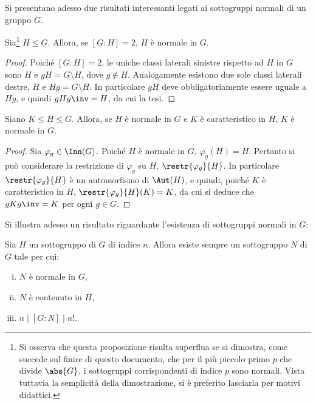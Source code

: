 \documentclass[12pt]{scrartcl}
\begin{document}
	Si presentano adesso due risultati interessanti legati ai sottogruppi normali di
	un gruppo $G$.
	
	\begin{proposition}
		Sia\footnote{
			Si osserva che questa proposizione risulta superflua se si dimostra,
			come succede sul finire di questo documento, che per il più piccolo
			primo $p$ che divide $\abs{G}$, i sottogruppi corrispondenti di
			indice $p$ sono normali. Vista tuttavia la semplicità della dimostrazione,
			si è preferito lasciarla per motivi didattici.
		} $H \leq G$. Allora, se $[G : H] = 2$, $H$ è normale in $G$.
	\end{proposition}
	
	\begin{proof}
		Poiché $[G : H] = 2$, le uniche classi laterali sinistre rispetto ad $H$ in
		$G$ sono $H$ e $gH = G \setminus H$, dove $g \notin H$. Analogamente esistono
		due sole classi laterali destre, $H$ e $Hg = G \setminus H$. In particolare
		$gH$ deve obbligatoriamente essere uguale a $Hg$, e quindi $gHg\inv = H$, da
		cui la tesi.
	\end{proof}
	
	\begin{proposition}
		Siano $K \leq H \leq G$. Allora, se $H$ è normale in $G$ e $K$ è caratteristico
		in $H$, $K$ è normale in $G$.
	\end{proposition}
	
	\begin{proof}
		Sia $\varphi_g \in \Inn(G)$. Poiché $H$ è normale in $G$, $\varphi_g(H) = H$. Pertanto
		si può considerare la restrizione di $\varphi_g$ su $H$, $\restr{\varphi_g}{H}$.
		In particolare $\restr{\varphi_g}{H}$ è un automorfismo di $\Aut(H)$, e quindi,
		poiché $K$ è caratteristico in $H$, $\restr{\varphi_g}{H}(K) = K$, da cui si
		deduce che $gKg\inv = K$ per ogni $g \in G$.
	\end{proof}
	
	Si illustra adesso un risultato riguardante l'esistenza di sottogruppi normali in $G$:
	\begin{theorem}[di Poincaré]
		Sia $H$ un sottogruppo di $G$ di indice $n$. Allora esiste sempre un sottogruppo
		$N$ di $G$ tale per cui:
		\begin{enumerate}[(i)]
			\item $N$ è normale in $G$,
			\item $N$ è contenuto in $H$,
			\item $n \mid [G : N] \mid n!$.
		\end{enumerate}
	\end{theorem}
	
\end{document}

